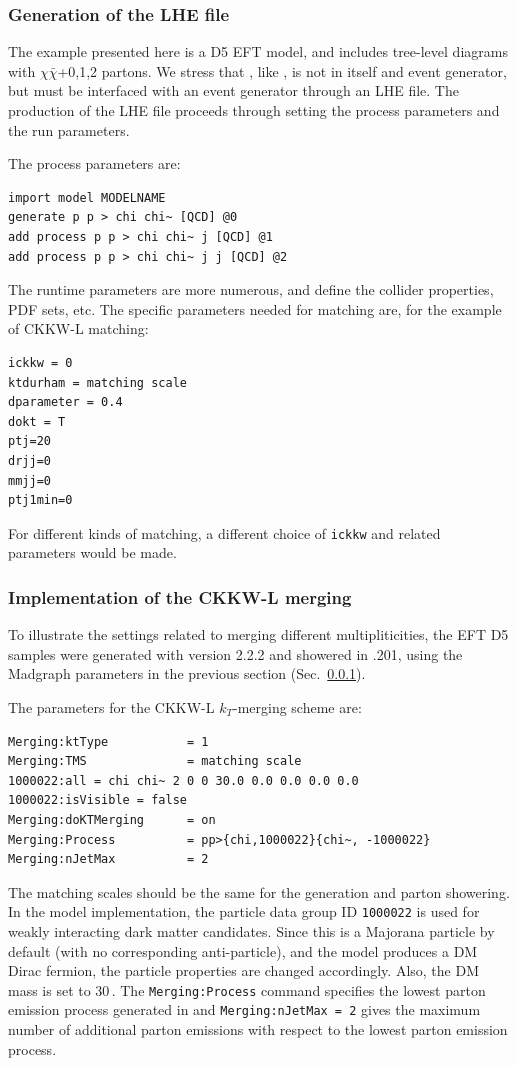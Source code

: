 \subsubsection{Generation of the LHE file}
\label{sub:MadgraphParameters}

The example presented here is a D5 EFT model, and
includes tree-level diagrams with $\chi\bar\chi$+0,1,2 partons.
We stress that \madgraph, like \powheg, is not in itself and event generator, but must be interfaced 
with an event generator through an LHE file.  The production of the LHE file proceeds through setting the 
process parameters and the run parameters.

The process parameters are:
\begin{verbatim}
import model MODELNAME
generate p p > chi chi~ [QCD] @0
add process p p > chi chi~ j [QCD] @1
add process p p > chi chi~ j j [QCD] @2
\end{verbatim}

The runtime parameters are more numerous, and define the
collider properties, PDF sets, etc.   The specific parameters
needed for matching are, for the example of CKKW-L matching:
\begin{verbatim}
ickkw = 0
ktdurham = matching scale
dparameter = 0.4
dokt = T
ptj=20
drjj=0
mmjj=0
ptj1min=0
\end{verbatim}
For different kinds of matching, a different choice of \texttt{ickkw} and
related parameters would be made.


\subsubsection{Implementation of the CKKW-L merging}
\label{sec:match_implementation}
To illustrate the settings related to merging different multipliticities, the EFT D5 samples were generated with \madgraph version 2.2.2 and showered in \pythiaEight.201, using the Madgraph parameters in the previous section (Sec.~\ref{sub:MadgraphParameters}).


The \pythiaEight parameters for the CKKW-L $k_T$-merging scheme are:
\begin{verbatim}
Merging:ktType           = 1
Merging:TMS              = matching scale
1000022:all = chi chi~ 2 0 0 30.0 0.0 0.0 0.0 0.0 
1000022:isVisible = false
Merging:doKTMerging      = on
Merging:Process          = pp>{chi,1000022}{chi~, -1000022}
Merging:nJetMax          = 2
\end{verbatim}
The matching scales should be the same for the generation and parton showering.
In the model implementation, the particle data group ID \texttt{1000022} is used for weakly
interacting dark matter candidates.   Since this is a Majorana particle by default (with no
corresponding anti-particle), and the model produces a DM Dirac fermion, the particle properties
are changed accordingly.  Also, the DM mass is set to 30\,\gev.
The \texttt{Merging:Process} command specifies the lowest parton emission process generated in \madgraph and \texttt{Merging:nJetMax = 2} gives the maximum number of additional parton emissions with respect to the lowest parton emission process. 


